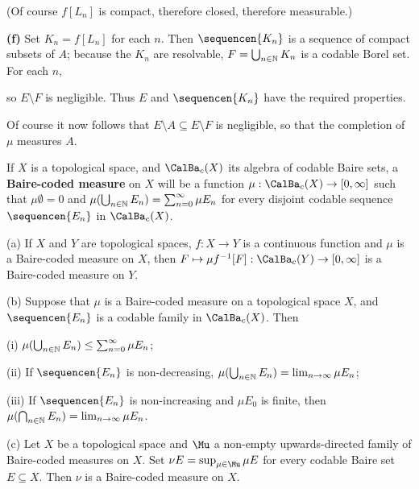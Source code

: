 {\noindent(Of course $f[L_n]$ is compact, therefore closed, therefore
measurable.)

\medskip

{\bf (f)} Set $K_n=f[L_n]$ for each $n$.   Then $\sequencen{K_n}$ is a
sequence of compact subsets of $A$;  because the $K_n$ are resolvable,
$F=\bigcup_{n\in\Bbb N}K_n$ is a codable Borel set.   For each $n$,


\noindent so $E\setminus F$ is negligible.
Thus $E$ and $\sequencen{K_n}$ have the required properties.

Of course it now follows that $E\setminus A\subseteq E\setminus F$ is
negligible, so that the completion of $\mu$ measures $A$.
}%

 
If $X$ is a topological space, and $\CalBa_c(X)$ its algebra of
codable Baire sets,
a {\bf Baire-coded measure} on $X$ will be a
function $\mu:\CalBa_c(X)\to[0,\infty]$ such that $\mu\emptyset=0$ and
$\mu(\bigcup_{n\in\Bbb N}E_n)=\sum_{n=0}^{\infty}\mu E_n$ for every
disjoint codable sequence $\sequencen{E_n}$ in $\CalBa_c(X)$.

 (a)
If $X$ and $Y$ are topological spaces, $f:X\to Y$ is a
continuous function and $\mu$ is a Baire-coded measure on $X$, then
$F\mapsto\mu f^{-1}[F]:\CalBa_c(Y)\to[0,\infty]$ is a Baire-coded measure
on $Y$.

(b) Suppose that $\mu$ is a Baire-coded measure on a
topological space $X$, and $\sequencen{E_n}$ is a codable family in
$\CalBa_c(X)$.   Then

\quad(i) $\mu(\bigcup_{n\in\Bbb N}E_n)\le\sum_{n=0}^{\infty}\mu E_n$;

\quad(ii) If $\sequencen{E_n}$ is non-decreasing,
$\mu(\bigcup_{n\in\Bbb N}E_n)=\lim_{n\to\infty}\mu E_n$;

\quad(iii) If $\sequencen{E_n}$ is non-increasing and $\mu E_0$ is finite,
then $\mu(\bigcap_{n\in\Bbb N}E_n)=\lim_{n\to\infty}\mu E_n$.

(c) Let $X$ be a topological space and $\Mu$ a non-empty
upwards-directed family of Baire-coded measures on $X$.   Set
$\nu E=\sup_{\mu\in\Mu}\mu E$ for every codable Baire set $E\subseteq X$.
Then $\nu$ is a Baire-coded measure on $X$.


